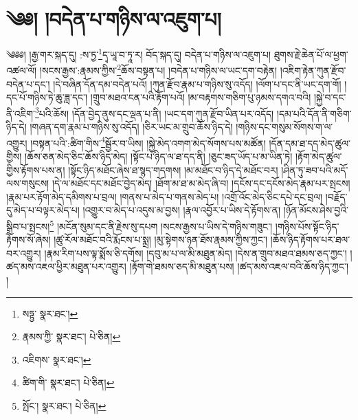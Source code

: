 \setcounter{footnote}{0} 
\chapter{༄༅། །བདེན་པ་གཉིས་ལ་འཇུག་པ།}༄༅༅། །རྒྱ་གར་སྐད་དུ། :ས་ཏྱ་\footnote{སཏྟྱ་  སྣར་ཐང་། }དྭ་ཡཱ་བ་ཏཱ་ར། བོད་སྐད་དུ། བདེན་པ་གཉིས་ལ་འཇུག་པ། ཐུགས་རྗེ་ཆེན་པོ་ལ་ཕྱག་འཚལ་ལོ། །སངས་རྒྱས་:རྣམས་ཀྱིས་\footnote{རྣམས་ཀྱི་  སྣར་ཐང་།  པེ་ཅིན། }ཆོས་བསྟན་པ། །བདེན་པ་གཉིས་ལ་ཡང་དག་བརྟེན། །འཇིག་རྟེན་ཀུན་རྫོབ་བདེན་པ་དང་། །དེ་བཞིན་དོན་དམ་བདེན་པའོ། །ཀུན་རྫོབ་རྣམ་པ་གཉིས་སུ་འདོད། །ལོག་པ་དང་ནི་ཡང་དག་གོ། །དང་པོ་གཉིས་ཏེ་ཆུ་ཟླ་དང་། །གྲུབ་མཐའ་ངན་པའི་རྟོག་པའོ། །མ་བརྟགས་གཅིག་པུ་ཉམས་དགའ་བའི། །སྐྱེ་བ་དང་ནི་འཇིག་\footnote{འཇིགས་  སྣར་ཐང་། }པའི་ཆོས། །དོན་བྱེད་ནུས་དང་ལྡན་པ་ནི། །ཡང་དག་ཀུན་རྫོབ་ཡིན་པར་འདོད། །དམ་པའི་དོན་ནི་གཅིག་ཉིད་དེ། །གཞན་དག་རྣམ་པ་གཉིས་སུ་འདོད། །ཅིར་ཡང་མ་གྲུབ་ཆོས་ཉིད་དེ། །གཉིས་དང་གསུམ་སོགས་ག་ལ་འགྱུར། །བསྟན་པའི་:ཚིག་གིས་\footnote{ཚིག་གི་  སྣར་ཐང་།  པེ་ཅིན། }སྦྱོར་བ་ཡིས། །སྐྱེ་མེད་འགག་མེད་སོགས་པས་མཚོན། །དོན་དམ་ཐ་དད་མེད་ཚུལ་གྱིས། །ཆོས་ཅན་མེད་ཅིང་ཆོས་ཉིད་མེད། །སྟོང་པ་ཉིད་ལ་ཐ་དད་ནི། །ཅུང་ཟད་ཡོད་པ་མ་ཡིན་ཏེ། །རྟོག་མེད་ཚུལ་གྱིས་རྟོགས་པས་ན། །སྟོང་ཉིད་མཐོང་ཞེས་ཐ་སྙད་གདགས། །མ་མཐོང་བ་ཉིད་དེ་མཐོང་བར། །ཤིན་ཏུ་ཟབ་པའི་མདོ་ལས་གསུངས། །དེ་ལ་མཐོང་དང་མཐོང་བྱེད་མེད། །ཐོག་མ་ཐ་མ་མེད་ཞི་བ། །དངོས་དང་དངོས་མེད་རྣམ་པར་སྤངས། །རྣམ་པར་རྟོག་མེད་དམིགས་པ་བྲལ། །གནས་པ་མེད་པ་གནས་མེད་པ། །འགྲོ་འོང་མེད་ཅིང་དཔེ་དང་བྲལ། །བརྗོད་དུ་མེད་པ་བལྟར་མེད་པ། །འགྱུར་བ་མེད་པ་འདུས་མ་བྱས། །རྣལ་འབྱོར་པ་ཡིས་དེ་རྟོགས་ན། །ཉོན་མོངས་ཤེས་བྱའི་སྒྲིབ་པ་སྤངས།\footnote{སྤོང་།  སྣར་ཐང་།  པེ་ཅིན། } །མངོན་སུམ་དང་ནི་རྗེས་སུ་དཔག །སངས་རྒྱས་པ་ཡིས་དེ་གཉིས་གཟུང་། །གཉིས་པོས་སྟོང་ཉིད་རྟོགས་སོ་ཞེས། །ཚུ་རོལ་མཐོང་བའི་རྨོངས་པ་སྨྲ། །མུ་སྟེགས་ཉན་ཐོས་རྣམས་ཀྱིས་ཀྱང་། །ཆོས་ཉིད་རྟོགས་པར་ཐལ་བར་འགྱུར། །རྣམ་རིག་པས་ལྟ་སྨོས་ཅི་དགོས། །དབུ་མ་པ་ལ་མི་མཐུན་མེད། །དེས་ན་གྲུབ་མཐའ་ཐམས་ཅད་ཀྱང་། །ཚད་མས་འཇལ་ཕྱིར་མཐུན་པར་འགྱུར། །རྟོག་གེ་ཐམས་ཅད་མི་མཐུན་པས། །ཚད་མས་འཇལ་བའི་ཆོས་ཉིད་ཀྱང་། །
